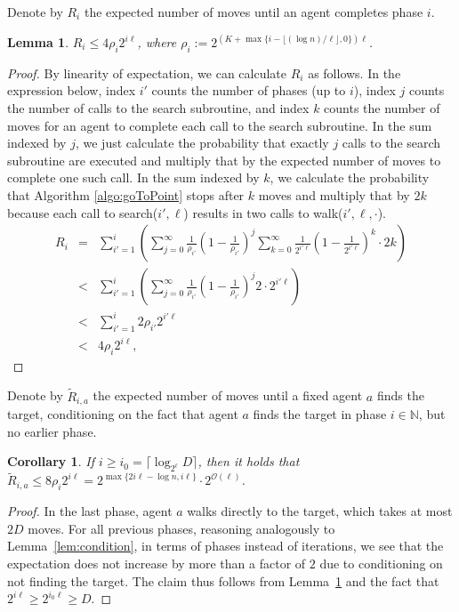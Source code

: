 \documentclass[11pt]{article}
\newtheorem{lemma}[theorem]{Lemma}
\newtheorem{corollary}[theorem]{Corollary}
\newcommand{\N}{\mathbb{N}}
\newcommand{\BO}{\mathcal{O}}
\begin{document}
Denote by $R_i$ the expected number of moves until an agent completes phase $i$. 

\begin{lemma}\label{lem:exp_i}
$R_i\leq 4\rho_i 2^{i\ell}$, where $\rho_i:=2^{(K+\max\{i-\lfloor (\log n)/\ell\rfloor,0\})\ell}$.
\end{lemma}
\begin{proof}
By linearity of expectation, we can calculate $R_i$ as follows. In the expression below, index $i'$ counts the number of phases (up to $i$), index $j$ counts the number of calls to the search subroutine, and index $k$ counts the number of moves for an agent to complete each call to the search subroutine. In the sum indexed by $j$, we just calculate the probability that exactly $j$ calls to the search subroutine are executed and multiply that by the expected number of moves to complete one such call. In the sum indexed by $k$, we calculate the probability that Algorithm \ref{algo:goToPoint} stops after $k$ moves and multiply that by $2k$ because  each call to search($i',\ell$) results in two calls to walk($i',\ell,\cdot$). 
\begin{eqnarray*}
R_i &=&\sum_{i'=1}^{i} \left( \sum_{j=0}^{\infty} \frac{1}{\rho_{i'}} \left(1-\frac{1}{\rho_{i'}}\right)^j \sum_{k=0}^{\infty}\frac{1}{2^{i'\ell}} \left(1-\frac{1}{2^{i'\ell}}\right)^k\cdot 2k \right) \\
&<& \sum_{i'=1}^{i} \left( \sum_{j=0}^{\infty} \frac{1}{\rho_{i'}} \left(1-\frac{1}{\rho_{i'}}\right)^j 2\cdot 2^{i'\ell} \right)\\
&<& \sum_{i'=1}^{i}  2 \rho_{i'} 2^{i'\ell}\\
&<& 4\rho_i 2^{i\ell},
\end{eqnarray*}
\end{proof}

Denote by $\tilde{R}_{i,a}$ the expected number of moves until a fixed agent $a$ finds the target, conditioning on the fact that agent $a$ finds the target in phase $i\in \N$, but no earlier phase.

\begin{corollary}
\label{coro:time}
	If $i\geq i_0 =\lceil \log_{2^\ell} D\rceil$, then it holds that $\tilde{R}_{i,a} \leq 8\rho_i 2^{i\ell}=2^{\max\{2i\ell-\log n,i\ell\}}\cdot 2^{\BO(\ell)}$.
\end{corollary}
\begin{proof}
In the last phase, agent $a$ walks directly to the target, which takes at most $2D$ moves. For all previous phases, reasoning analogously to Lemma~\ref{lem:condition}, in terms of phases instead of iterations, we see that the expectation does not increase by more than a factor of $2$ due to conditioning on not finding the target. The claim thus follows from Lemma~\ref{lem:exp_i} and the fact that $2^{i\ell}\geq 2^{i_0\ell}\geq D$.
\end{proof}
\end{document}
